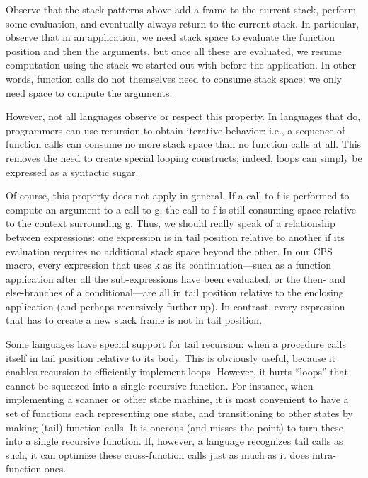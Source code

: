 
Observe that the stack patterns above add a frame to the current stack, perform
some evaluation, and eventually always return to the current stack. In
particular, observe that in an application, we need stack space to evaluate the
function position and then the arguments, but once all these are evaluated, we
resume computation using the stack we started out with before the application.
In other words, function calls do not themselves need to consume stack space: we
only need space to compute the arguments.

However, not all languages observe or respect this property. In languages that
do, programmers can use recursion to obtain iterative behavior: i.e., a sequence
of function calls can consume no more stack space than no function calls at all.
This removes the need to create special looping constructs; indeed, loops can
simply be expressed as a syntactic sugar.

Of course, this property does not apply in general. If a call to f is performed
to compute an argument to a call to g, the call to f is still consuming space
relative to the context surrounding g. Thus, we should really speak of a
relationship between expressions: one expression is in tail position relative to
another if its evaluation requires no additional stack space beyond the other.
In our CPS macro, every expression that uses k as its continuation—such as a
function application after all the sub-expressions have been evaluated, or the
then- and else-branches of a conditional—are all in tail position relative to
the enclosing application (and perhaps recursively further up). In contrast,
every expression that has to create a new stack frame is not in tail position.

Some languages have special support for tail recursion: when a procedure calls
itself in tail position relative to its body. This is obviously useful, because
it enables recursion to efficiently implement loops. However, it hurts “loops”
that cannot be squeezed into a single recursive function. For instance, when
implementing a scanner or other state machine, it is most convenient to have a
set of functions each representing one state, and transitioning to other states
by making (tail) function calls. It is onerous (and misses the point) to turn
these into a single recursive function. If, however, a language recognizes tail
calls as such, it can optimize these cross-function calls just as much as it
does intra-function ones.

